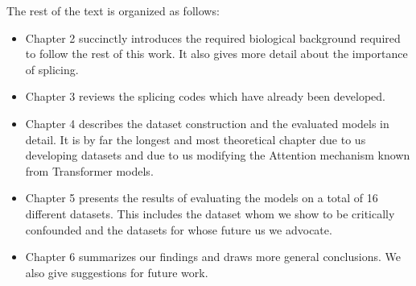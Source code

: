 The rest of the text is organized as follows:
\begin{itemize}
	\item Chapter 2 succinctly introduces the required biological background required to follow the rest of this work. It also gives more detail about the importance of splicing.
	\item Chapter 3 reviews the splicing codes which have already been developed.
	\item Chapter 4 describes the dataset construction and the evaluated models in detail. It is by far the longest and most theoretical chapter due to us developing datasets and due to us modifying the Attention mechanism known from Transformer models.
	\item Chapter 5 presents the results of evaluating the models on a total of 16 different datasets. This includes the dataset whom we show to be critically confounded and the datasets for whose future us we advocate.
	\item Chapter 6 summarizes our findings and draws more general conclusions. We also give suggestions for future work.
\end{itemize}

%
%


